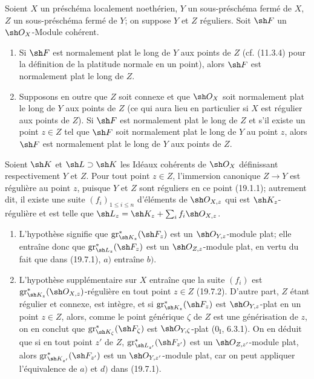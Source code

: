 \begin{corollary}[19.7.5]
\label{IV.19.7.5}
Soient $X$ un préschéma localement noethérien, $Y$ un sous-préschéma fermé de $X$, $Z$ un sous-préschéma fermé de $Y$; on suppose $Y$ et $Z$ réguliers. Soit $\sh F$ un $\sh O_X$-Module cohérent.
\begin{enumerate}
  \item[(i)] Si $\sh F$ est normalement plat le long de $Y$ aux points de $Z$ (cf. (11.3.4) pour la définition de la platitude normale en un point), alors $\sh F$ est normalement plat le long de $Z$.
  \item[(ii)] Supposons en outre que $Z$ soit connexe et que $\sh O_X$ soit normalement plat le long de $Y$ aux points de $Z$ (ce qui aura lieu en particulier si $X$ est régulier aux points de $Z$). Si $\sh F$ est normalement plat le long de $Z$ et s'il existe un point $z\in Z$ tel que $\sh F$ soit normalement plat le long de $Y$ au point $z$, alors $\sh F$ est normalement plat le long de $Y$ aux points de $Z$.
\end{enumerate}

Soient $\sh K$ et $\sh L\supset\sh K$ les Idéaux cohérents de $\sh O_X$ définissant respectivement $Y$ et $Z$. Pour tout point $z\in Z$, l'immersion canonique $Z\to Y$ est régulière au point $z$, puisque $Y$ et $Z$ sont réguliers en ce point (19.1.1); autrement dit, il existe une suite $(f_i)_{1\leq i\leq n}$ d'éléments de $\sh O_{X,z}$ qui est $\sh K_z$-régulière et est telle que $\sh L_z=\sh K_z+\sum_i f_i\sh O_{X,z}$.
\begin{enumerate}
  \item[(i)] L'hypothèse signifie que $\operatorname{gr}_{\sh K_z}^*(\sh F_z)$ est un $\sh O_{Y,z}$-module plat; elle entraîne donc que $\operatorname{gr}_{\sh L_z}^*(\sh F_z)$ est un $\sh O_{Z,z}$-module plat, en vertu du fait que dans (19.7.1), $a)$ entraîne $b)$.
  \item[(ii)] L'hypothèse supplémentaire sur $X$ entraîne que la suite $(f_i)$ est $\operatorname{gr}_{\sh K_z}^*(\sh O_{X,z})$-régulière en tout point $z\in Z$ (19.7.2). D'autre part, $Z$ étant régulier et connexe, est intègre, et si $\operatorname{gr}_{\sh K_z}^*(\sh F_z)$ est $\sh O_{Y,z}$-plat en un point $z\in Z$, alors, comme le point générique $\zeta$ de $Z$ est une générisation de $z$, on en conclut que $\operatorname{gr}_{\sh K_\zeta}^*(\sh F_\zeta)$ est $\sh O_{Y,\zeta}$-plat ($0_{\mathrm I}$, 6.3.1). On en déduit que si en tout point $z'$ de $Z$, $\operatorname{gr}_{\sh L_{z'}}^*(\sh F_{z'})$ est un $\sh O_{Z,z'}$-module plat, alors $\operatorname{gr}_{\sh K_{z'}}^*(\sh F_{z'})$ est un $\sh O_{Y,z'}$-module plat, car on peut appliquer l'équivalence de $a)$ et $d)$ dans (19.7.1).
\end{enumerate}
\end{corollary}

